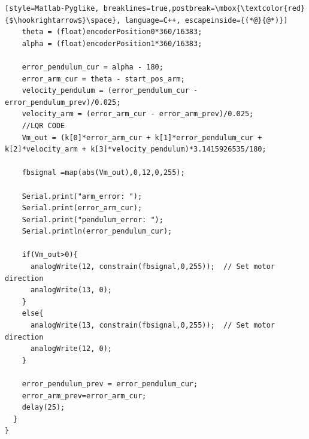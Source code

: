 \documentclass{article}
\begin{document}
\begin{lstlisting}[style=Matlab-Pyglike, breaklines=true,postbreak=\mbox{\textcolor{red}{$\hookrightarrow$}\space}, language=C++, escapeinside={(*@}{@*)}]
    theta = (float)encoderPosition0*360/16383;
    alpha = (float)encoderPosition1*360/16383;
   
    error_pendulum_cur = alpha - 180;
    error_arm_cur = theta - start_pos_arm;
    velocity_pendulum = (error_pendulum_cur - error_pendulum_prev)/0.025;
    velocity_arm = (error_arm_cur - error_arm_prev)/0.025;
    //LQR CODE
    Vm_out = (k[0]*error_arm_cur + k[1]*error_pendulum_cur + k[2]*velocity_arm + k[3]*velocity_pendulum)*3.1415926535/180;
    
    fbsignal =map(abs(Vm_out),0,12,0,255);

    Serial.print("arm_error: ");
    Serial.print(error_arm_cur);
    Serial.print("pendulum_error: ");
    Serial.println(error_pendulum_cur);

    if(Vm_out>0){
      analogWrite(12, constrain(fbsignal,0,255));  // Set motor direction
      analogWrite(13, 0);
    }
    else{
      analogWrite(13, constrain(fbsignal,0,255));  // Set motor direction
      analogWrite(12, 0);
    }

    error_pendulum_prev = error_pendulum_cur;
    error_arm_prev=error_arm_cur;
    delay(25);
  }
}

\end{lstlisting}

\end{document}
